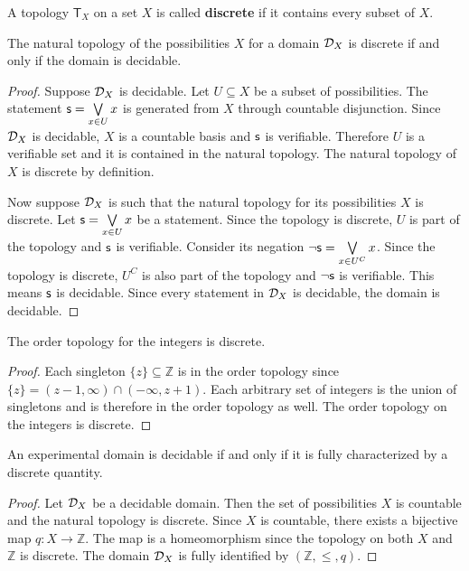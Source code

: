 \documentclass[11pt,letterpaper,fleqn]{memoir} %
\begin{document}
\begin{mathSection}
	\begin{defn}
		A topology $\mathsf{T}_X$ on a set $X$ is called \textbf{discrete} if it contains every subset of $X$.
	\end{defn}
	
\begin{thrm}\label{thrm_decidablity_is_discreteness}
	The natural topology of the possibilities $X$ for a domain $\mathcal{D}_X$ is discrete if and only if the domain is decidable.
\end{thrm}
\begin{proof}
	Suppose $\mathcal{D}_X$ is decidable. Let $U \subseteq X$ be a subset of possibilities. The statement $\mathsf{s} = \bigvee\limits_{x \in U} x$ is generated from $X$ through countable disjunction. Since $\mathcal{D}_X$ is decidable, $X$ is a countable basis and $\mathsf{s}$ is verifiable. Therefore $U$ is a verifiable set and it is contained in the natural topology. The natural topology of $X$ is discrete by definition.
	
	Now suppose $\mathcal{D}_X$ is such that the natural topology for its possibilities $X$ is discrete. Let $\mathsf{s} = \bigvee\limits_{x \in U} x$ be a statement. Since the topology is discrete, $U$ is part of the topology and $\mathsf{s}$ is verifiable. Consider its negation $\neg\mathsf{s} = \bigvee\limits_{x \in U^C} x$. Since the topology is discrete, $U^C$ is also part of the topology and $\neg\mathsf{s}$ is verifiable. This means $\mathsf{s}$ is decidable. Since every statement in $\mathcal{D}_X$ is decidable, the domain is decidable.
\end{proof}
	
\begin{prop}
	The order topology for the integers is discrete.
\end{prop}
\begin{proof}
	Each singleton $\{z\} \subseteq \mathbb{Z}$ is in the order topology since $\{z\} = (z-1, \infty) \cap (-\infty, z+1)$. Each arbitrary set of integers is the union of singletons and is therefore in the order topology as well. The order topology on the integers is discrete.
\end{proof}
	
	\begin{prop}
		An experimental domain is decidable if and only if it is fully characterized by a discrete quantity.
	\end{prop}
	
	\begin{proof}
		Let $\mathcal{D}_X$ be a decidable domain. Then the set of possibilities $X$ is countable and the natural topology is discrete. Since $X$ is countable, there exists a bijective map $q: X \to \mathbb{Z}$. The map is a homeomorphism since the topology on both $X$ and $\mathbb{Z}$ is discrete. The domain $\mathcal{D}_X$ is fully identified by $(\mathbb{Z}, \leq, q)$.
		

\end{proof}
\end{mathSection}
\end{document}
